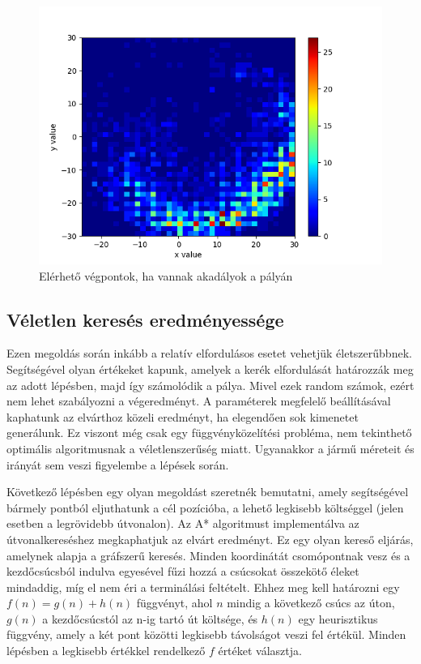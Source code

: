 \begin{figure}[h!]
\centering
\includegraphics[scale=0.75]{images/obstacles_histogram2d.png}
\caption{Elérhető végpontok, ha vannak akadályok a pályán}
\label{fig:obstacles_histogram2d}
\end{figure}

\newpage

\subsection{Véletlen keresés eredményessége}
Ezen megoldás során inkább a relatív elfordulásos esetet vehetjük életszerűbbnek. Segítségével olyan értékeket kapunk, amelyek a kerék elfordulását határozzák meg az adott lépésben, majd így számolódik a pálya. Mivel ezek random számok, ezért nem lehet szabályozni a végeredményt. A paraméterek megfelelő beállításával kaphatunk az elvárthoz közeli eredményt, ha elegendően sok kimenetet generálunk. Ez viszont még csak egy függvényközelítési probléma, nem tekinthető optimális algoritmusnak a véletlenszerűség miatt. Ugyanakkor a jármű méreteit és irányát sem veszi figyelembe a lépések során.


Következő lépésben egy olyan megoldást szeretnék bemutatni, amely segítségével bármely pontból eljuthatunk a cél pozícióba, a lehető legkisebb költséggel (jelen esetben a legrövidebb útvonalon).
Az A* algoritmust implementálva az útvonalkereséshez megkaphatjuk az elvárt eredményt. Ez egy olyan kereső eljárás, amelynek alapja a gráfszerű keresés. Minden koordinátát csomópontnak vesz és a kezdőcsúcsból indulva egyesével fűzi hozzá a csúcsokat összekötő éleket mindaddig, míg el nem éri a terminálási feltételt. Ehhez meg kell határozni egy $ f(n) = g(n) + h(n) $ függvényt, ahol $ n $ mindig a következő csúcs az úton, $ g(n) $ a kezdőcsúcstól az n-ig tartó út költsége, és $ h(n) $ egy heurisztikus függvény, amely a két pont közötti legkisebb távolságot veszi fel értékül. Minden lépésben a legkisebb értékkel rendelkező $ f $ értéket választja.
\\

